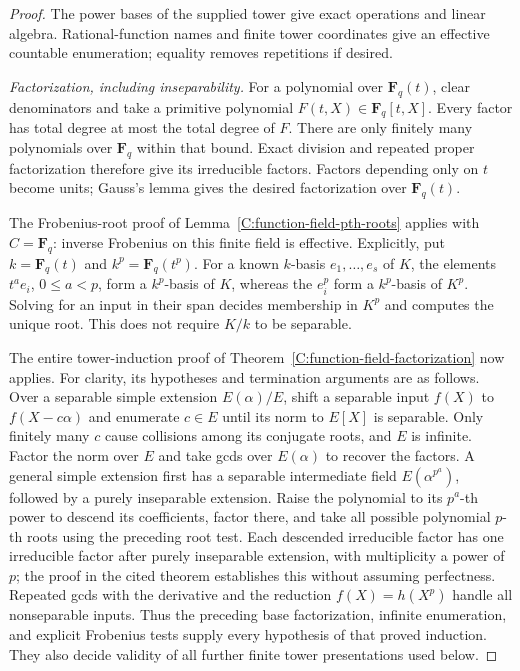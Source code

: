 \begin{proof}
The power bases of the supplied tower give exact operations
and linear algebra. Rational-function names and finite tower
coordinates give an effective countable enumeration; equality
removes repetitions if desired.

\emph{Factorization, including inseparability.}
For a polynomial over $\mathbf F_q(t)$, clear denominators
and take a primitive polynomial $F(t,X)\in\mathbf F_q[t,X]$.
Every factor has total degree at most the total degree of $F$.
There are only finitely many polynomials over $\mathbf F_q$
within that bound. Exact division and repeated proper
factorization therefore give its irreducible factors.
Factors depending only on $t$ become units; Gauss's lemma
gives the desired factorization over $\mathbf F_q(t)$.

The Frobenius-root proof of
Lemma~\ref{C:function-field-pth-roots} applies with
$C=\mathbf F_q$: inverse Frobenius on this finite field is
effective. Explicitly, put $k=\mathbf F_q(t)$ and
$k^p=\mathbf F_q(t^p)$. For a known $k$-basis
$e_1,\ldots,e_s$ of $K$, the elements
$t^a e_i$, $0\leq a<p$, form a $k^p$-basis of $K$, whereas
the $e_i^p$ form a $k^p$-basis of $K^p$.
Solving for an input in their span decides membership in
$K^p$ and computes the unique root. This does not require
$K/k$ to be separable.

The entire tower-induction proof of
Theorem~\ref{C:function-field-factorization} now applies.
For clarity, its hypotheses and termination arguments are
as follows. Over a separable simple extension $E(\alpha)/E$,
shift a separable input $f(X)$ to $f(X-c\alpha)$ and enumerate
$c\in E$ until its norm to $E[X]$ is separable.
Only finitely many $c$ cause collisions among its conjugate
roots, and $E$ is infinite. Factor the norm over $E$ and
take gcds over $E(\alpha)$ to recover the factors. A general
simple extension first has a separable intermediate field
$E(\alpha^{p^a})$, followed by a purely inseparable extension.
Raise the polynomial to its $p^a$-th power to descend its
coefficients, factor there, and take all possible polynomial
$p$-th roots using the preceding root test. Each descended
irreducible factor has one irreducible factor after purely
inseparable extension, with multiplicity a power of $p$;
the proof in the cited theorem establishes this without
assuming perfectness. Repeated gcds with the derivative and
the reduction $f(X)=h(X^p)$ handle all nonseparable inputs.
Thus the preceding base factorization, infinite enumeration,
and explicit Frobenius tests supply every hypothesis of that
proved induction. They also decide validity of all further
finite tower presentations used below.


\end{proof}
